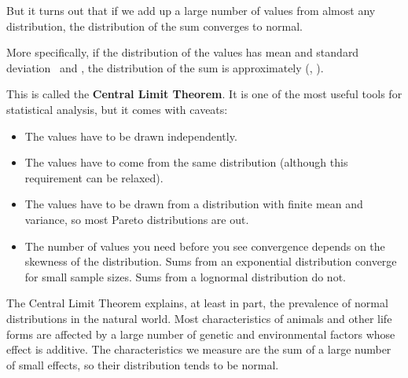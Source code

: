 \documentclass[12pt]{book}
\begin{document}
But it turns out that if we add up a large number of values from
almost any distribution, the distribution of the sum converges to
normal.

More specifically, if the distribution of the values has mean and
standard deviation \mymu~and \mysigma, the distribution of the sum is
approximately \mynormal(\n \mymu, \n \sigmasq).

This is called the {\bf Central Limit Theorem}.  It is one of the
most useful tools for statistical analysis, but it comes with
caveats:

\begin{itemize}

\item The values have to be drawn independently.

\item The values have to come from the same distribution (although
  this requirement can be relaxed).

\item The values have to be drawn
  from a distribution with finite mean and variance, so most Pareto
  distributions are out.

\item The number of values you need before you see convergence depends
  on the skewness of the distribution.  Sums from an exponential
  distribution converge for small sample sizes.  Sums from a
  lognormal distribution do not.

\end{itemize}


The Central Limit Theorem explains, at least in part, the prevalence
of normal distributions in the natural world.  Most characteristics of
animals and other life forms are affected by a large number of genetic
and environmental factors whose effect is additive.  The characteristics
we measure are the sum of a large number of small effects, so their
distribution tends to be normal.
\end{document}
